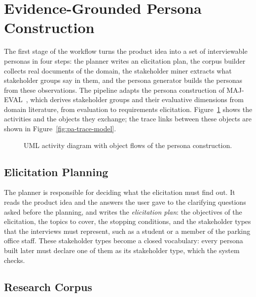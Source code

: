 \section{Evidence-Grounded Persona Construction}
\label{sec:pa-personas}

The first stage of the workflow turns the product idea into a set of interviewable personas in four steps: the planner writes an elicitation plan, the corpus builder collects real documents of the domain, the stakeholder miner extracts what stakeholder groups say in them, and the persona generator builds the personas from these observations. The pipeline adapts the persona construction of MAJ-EVAL~\cite{chen2026majeval}, which derives stakeholder groups and their evaluative dimensions from domain literature, from evaluation to requirements elicitation. Figure~\ref{fig:pa-grounding} shows the activities and the objects they exchange; the trace links between these objects are shown in Figure~\ref{fig:pa-trace-model}.

\begin{figure}[H]
    \centering
    \resizebox{\linewidth}{!}{}
    \caption{UML activity diagram with object flows of the persona construction.}
    \label{fig:pa-grounding}
\end{figure}

\subsection{Elicitation Planning}
\label{sec:pa-planning}

The planner is responsible for deciding what the elicitation must find out. It reads the product idea and the answers the user gave to the clarifying questions asked before the planning, and writes the \emph{elicitation plan}: the objectives of the elicitation, the topics to cover, the stopping conditions, and the stakeholder types that the interviews must represent, such as a student or a member of the parking office staff. These stakeholder types become a closed vocabulary: every persona built later must declare one of them as its stakeholder type, which the system checks.

\subsection{Research Corpus}
\label{sec:pa-corpus}

